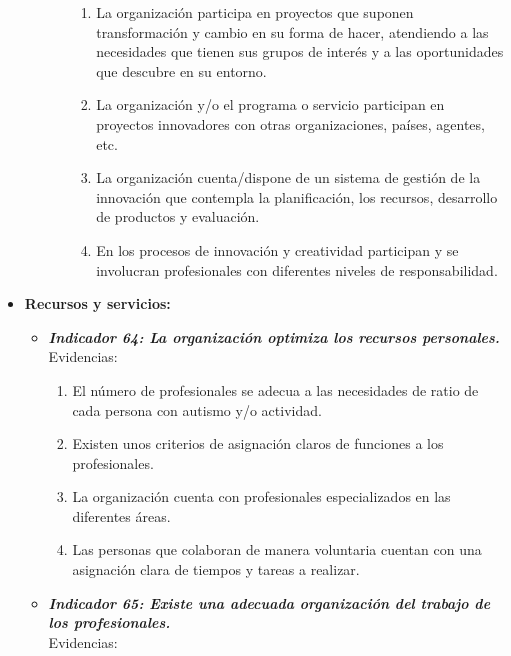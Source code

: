 \begin{itemize}
\begin{itemize}
\begin{itemize}
			\begin{enumerate}
				\item La organización participa en proyectos que suponen transformación y cambio en su forma de hacer, atendiendo a las necesidades que tienen sus grupos de interés y a las oportunidades que descubre en su entorno. 
				\item La organización y/o el programa o servicio participan en proyectos innovadores con otras organizaciones, países, agentes, etc. 
				\item La organización cuenta/dispone de un sistema de gestión de la innovación que contempla la planificación, los recursos, desarrollo de productos y evaluación. 
				\item En los procesos de innovación y creatividad participan y se involucran profesionales con diferentes niveles de responsabilidad. 
			\end{enumerate}
		\end{itemize}
	\end{itemize}

	\item \textbf{Recursos y servicios:}
	\begin{itemize}
		\item \textbf{\textit{Indicador 64: La organización optimiza los recursos personales.}}\\Evidencias:
			
		\begin{enumerate}
			\item El número de profesionales se adecua a las necesidades de ratio de cada persona con autismo y/o actividad. 
			\item Existen unos criterios de asignación claros de funciones a los profesionales. 
			\item La organización cuenta con profesionales especializados en las diferentes áreas. 
			\item Las personas que colaboran de manera voluntaria cuentan con una asignación clara de tiempos y tareas a realizar.
		\end{enumerate}
		\item \textbf{\textit{Indicador 65: Existe una adecuada organización del trabajo de los profesionales.}}\\Evidencias:
		

\end{itemize}
\end{itemize}
